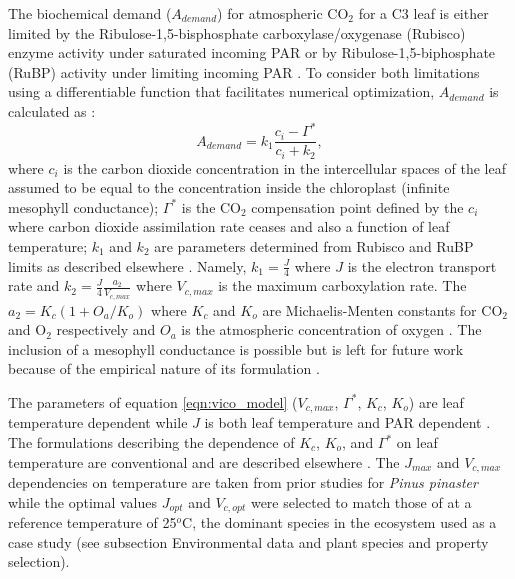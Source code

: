 \documentclass[utf8]{frontiersSCNS} %
\begin{document}
The biochemical demand ($A_{demand}$) for atmospheric CO$_2$ for a C3 leaf is either limited by the Ribulose-1,5-bisphosphate carboxylase/oxygenase (Rubisco) enzyme activity under saturated incoming PAR or by Ribulose-1,5-biphosphate (RuBP) activity under limiting incoming PAR \citep{farquhar_biochemical_1980}. To consider both limitations using a differentiable function that facilitates numerical optimization, $A_{demand}$ is calculated as \citep{vico_perspective_2013}:
\begin{equation}
    \label{eqn:vico_model}
    A_{demand} = k_1 \frac{c_i - \Gamma^*}{c_i + k_2},
\end{equation}
where $c_i$ is the carbon dioxide concentration in the intercellular spaces of the leaf assumed to be equal to the concentration inside the chloroplast (infinite mesophyll conductance); $\Gamma^*$ is the CO$_2$ compensation point defined by the $c_i$ where carbon dioxide assimilation rate ceases and also a function of leaf temperature; $k_1$ and $k_2$ are parameters determined from Rubisco and RuBP limits as described elsewhere \citep{vico_perspective_2013}. Namely, $k_1 = \frac{J}{4}$ where $J$ is the electron transport rate and $k_2 = \frac{J}{4} \frac{a_2}{V_{c,max}}$ where $V_{c,max}$ is the maximum carboxylation rate. The $a_2 = K_c (1+O_a/K_o)$ where $K_c$ and $K_o$ are Michaelis-Menten constants for CO$_2$ and O$_2$ respectively and $O_a$ is the atmospheric concentration of oxygen \citep{bernacchi_improved_2001}. The inclusion of a mesophyll conductance is possible but is left for future work because of the empirical nature of its formulation \citep{dewar2018new}.


The parameters of equation \ref{eqn:vico_model} ($V_{c,max}$, $\Gamma^*$, $K_c$, $K_o$) are leaf temperature dependent while $J$ is both leaf temperature and PAR dependent \citep{medlyn_temperature_2002}. The formulations describing the dependence of $K_c$, $K_o$, and $\Gamma^*$ on leaf temperature are conventional and are described elsewhere \citep{bernacchi_improved_2001}. The $J_{max}$ and $V_{c,max}$ dependencies on temperature are taken from prior studies for \textit{Pinus pinaster} \citep{medlyn_temperature_2002} while the optimal values $J_{opt}$ and $V_{c,opt}$ were selected to match those of  at a reference temperature of 25$^o$C, the dominant species in the ecosystem used as a case study (see subsection Environmental data and plant species and property selection).
\end{document}
